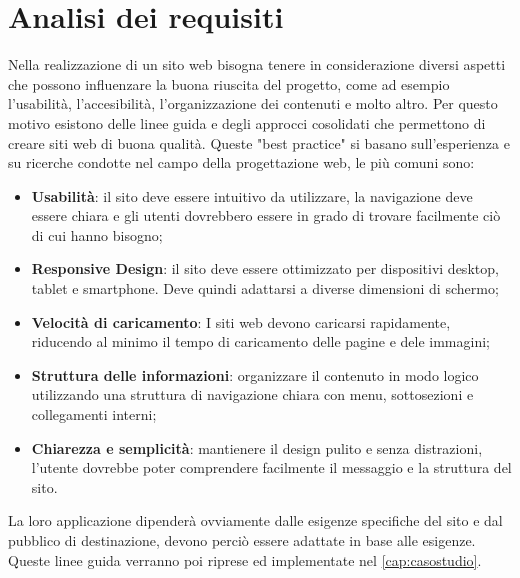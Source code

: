 \documentclass[target=bach,aauheader=]{thud}
\begin{document}
\section{Analisi dei requisiti}
Nella realizzazione di un sito web bisogna tenere in considerazione diversi aspetti che possono influenzare la buona riuscita del progetto, come ad esempio l'usabilità, l'accesibilità, l'organizzazione dei contenuti e molto altro.
Per questo motivo esistono delle linee guida e degli approcci cosolidati che permettono di creare siti web di buona qualità. Queste "best practice" si basano sull'esperienza e su ricerche condotte nel campo della progettazione web, le più comuni sono:
\begin{itemize}
    \item \textbf{Usabilità}: il sito deve essere intuitivo da utilizzare, la navigazione deve essere chiara e gli utenti dovrebbero essere in grado di trovare facilmente ciò di cui hanno bisogno;
    \item \textbf{Responsive Design}: il sito deve essere ottimizzato per dispositivi desktop, tablet e smartphone. Deve quindi adattarsi a diverse dimensioni di schermo;
    \item \textbf{Velocità di caricamento}: I siti web devono caricarsi rapidamente, riducendo al minimo il tempo di caricamento delle pagine e dele immagini;
    \item \textbf{Struttura delle informazioni}: organizzare il contenuto in modo logico utilizzando una struttura di navigazione chiara con menu, sottosezioni e collegamenti interni;
    \item \textbf{Chiarezza e semplicità}: mantienere il design pulito e senza distrazioni, l'utente dovrebbe poter comprendere facilmente il messaggio e la struttura del sito.
\end{itemize}
La loro applicazione dipenderà ovviamente dalle esigenze specifiche del sito e dal pubblico di destinazione, devono perciò essere adattate in base alle esigenze.
\newline Queste linee guida verranno poi riprese ed implementate nel \cref{cap:casostudio}.
\end{document}
